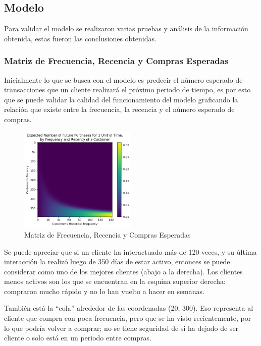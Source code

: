 \subsection{Modelo}

Para validar el modelo se realizaron varias pruebas y análisis de la información obtenida, estas fueron las conclusiones obtenidas.

\subsubsection{Matriz de Frecuencia, Recencia y Compras Esperadas}

Inicialmente lo que se busca con el modelo es predecir el número esperado de transacciones que un cliente realizará el próximo periodo de tiempo, es por esto que se puede validar la calidad del funcionamiento del modelo graficando la relación que existe entre la frecuencia, la recencia y el número esperado de compras.

\begin{figure}[H]
	\centering \includegraphics[width=0.50\textwidth]{images/matriz-f-r.png}
	\caption{Matriz de Frecuencia, Recencia y Compras Esperadas}
	\label{fig:frc}
\end{figure}

	Se puede apreciar que si un cliente ha interactuado más de 120 veces, y su última interacción la realizó luego de 350 días de estar activo, entonces se puede considerar como uno de los mejores clientes (abajo a la derecha). Los clientes menos activos son los que se encuentran en la esquina superior derecha: compraron mucho rápido y no lo han vuelto a hacer en semanas.

	También está la “cola” alrededor de las coordenadas (20, 300). Eso representa al cliente que compra con poca frecuencia, pero que se ha visto recientemente, por lo que podría volver a comprar; no se tiene seguridad de si ha dejado de ser cliente o solo está en un periodo entre compras.
	
